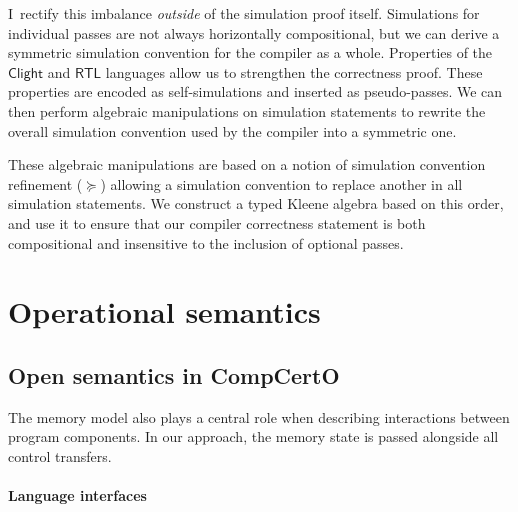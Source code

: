 \documentclass[11pt,oneside]{book}
\theoremstyle{definition}
\newcommand{\kw}[1]{\ensuremath{ \mathsf{#1} }}
\newcommand{\scref}{\succeq} %
\begin{document}
I~rectify this imbalance \emph{outside}
of the simulation proof itself.
Simulations for individual passes are not always
horizontally compositional,
but we can derive a symmetric simulation convention
for the compiler as a whole.
Properties of the $\kw{Clight}$ and $\kw{RTL}$ languages
allow us to strengthen the correctness proof.
These properties are encoded as self-simulations
and inserted as pseudo-passes.
We can then perform algebraic manipulations
on simulation statements
to rewrite the overall simulation convention
used by the compiler into a symmetric one.

These algebraic manipulations are
based on a notion of
simulation convention refinement ($\scref$)
allowing a simulation convention
to replace another in all simulation statements.
We construct a typed Kleene algebra \citep{tka}
based on this order,
and use it to ensure that
our compiler correctness statement
is both compositional
and insensitive to the inclusion of optional passes.



\section{Operational semantics} \label{sec:sem} %


\subsection{Open semantics in CompCertO} \label{sec:sem:open} %

The memory model also plays a central role
when describing interactions between program components.
In our approach, %
the memory state is passed %
alongside all control transfers.

\paragraph{Language interfaces} %
\end{document}
